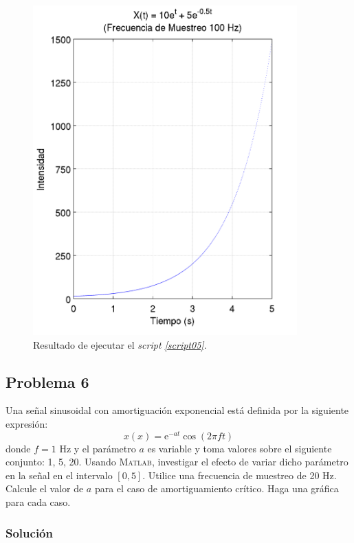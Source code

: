 \documentclass[a4paper,12pt,final]{article}
\begin{document}
      \begin{figure}[H]
        \caption{Resultado de ejecutar el \emph{script \ref{script05}}.}
        \label{script05figure}
        \includegraphics[height=5in]{./laboratorio_2/problema05.png}
      \end{figure}
      \vspace{\fill}

  \newpage
  \subsection*{Problema 6}
    \noindent Una señal sinusoidal con amortiguación exponencial está definida
    por la siguiente expresión:
    $$x\left(x\right) = \mathrm{e}^{-at}\cos\left(2\pi f t\right)$$
    donde $f = 1$ Hz y el parámetro $a$ es variable y toma valores sobre el
    siguiente conjunto: 1, 5, 20. Usando \textsc{Matlab}, investigar el
    efecto de variar dicho parámetro en la señal en el intervalo $[0, 5]$.
    Utilice una frecuencia de muestreo de 20 Hz. Calcule el valor de $a$
    para el caso de amortiguamiento crítico. Haga una gráfica para cada
    caso.

    \subsubsection*{Solución}
      \begin{listing}[H]
        \caption{}
        \label{script06}
        \inputminted{matlab}{./laboratorio_2/problema06.m}
      \end{listing}
\end{document}
